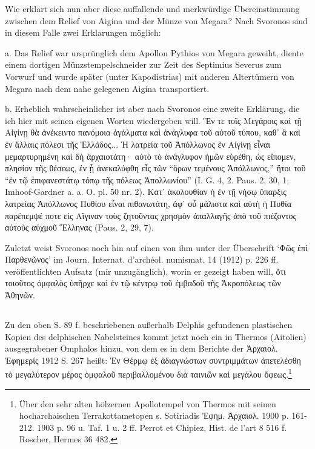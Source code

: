 \documentclass[a4paper, 11pt, oneside]{article}
\begin{document}
Wie erklärt sich nun aber diese auffallende und merkwürdige Übereinstimmung zwischen dem Relief von Aigina und der Münze von Megara? Nach Svoronos sind in diesem Falle zwei Erklarungen möglich:

a. Das Relief war ursprünglich dem Apollon Pythios von Megara geweiht, diente einem dortigen Münzstempelschneider zur Zeit des Septimius Severus zum Vorwurf und wurde später (unter Kapodistrias) mit anderen Altertümern von Megara nach dem nahe gelegenen Aigina transportiert.

b. Erheblich wahrscheinlicher ist aber nach Svoronos eine zweite Erklärung, die ich hier mit seinen eigenen Worten wiedergeben will. Ἔν τε τοῖς Μεγάροις καὶ τῇ Αἰγίνῃ θὰ ἀνέκειντο πανόμοια ἀγάλματα καὶ ἀνάγλυφα τοῦ αὐτοῦ τύπου, καθ᾽ ἃ καὶ ἐν ἄλλαις πόλεσι τῆς Ἑλλάδος... Ἡ λατρεία τοῦ Ἀπόλλωνος ἐν Αἰγίνῃ εἶναι μεμαρτυρημένη καὶ δὴ ἀρχαιοτάτη· αὐτὸ τὸ ἀνάγλυφον ἡμῶν εὑρέθη, ὡς εἴπομεν, πλησίον τῆς θέσεως, ἐν ᾗ ἀνεκαλύφθη εἷς τῶν "`ὅρων τεμένους Ἀπόλλωνος,"' ἤτοι τοῦ "`ἐν τῷ ἐπιφανεστάτῳ τόπῳ τῆς πόλεως Ἀπολλωνίου"' (I. G. 4, 2. Paus. 2, 30, 1; Imhoof-Gardner a. a. O. pl. 50 nr. 2). Κατ᾽ ἀκολουθίαν ἡ ἐν τῇ νήσῳ ὕπαρξις λατρείας Ἀπόλλωνος Πυθίου εἶναι πιθανωτάτη, ἀφ᾽ οὗ μάλιστα καὶ αὐτὴ ἡ Πυθία παρέπεμψέ ποτε εἰς Αἴγιναν τοὺς ζητοῦντας χρησμὸν ἀπαλλαγῆς ἀπὸ τοῦ πιέζοντος αὐτοὺς αὐχμοῦ Ἕλληνας (Paus. 2, 29, 7).

Zuletzt weist Svoronos noch hin auf einen von ihm unter der Überschrift `Φῶς ἐπὶ Παρθενῶνος' im Journ. Internat. d'archéol. numismat. 14 (1912) p. 226 ff. veröffentlichten Aufsatz (mir unzugänglich), worin er gezeigt haben will, ὅτι τοιοῦτος ὀμφαλὸς ὑπῆρχε καὶ ἐν τῷ κέντρῳ τοῦ ἐμβαδοῦ τῆς Ἀκροπόλεως τῶν Ἀθηνῶν.

\subsection{}
\paragraph{}
Zu den oben S. 89 f. beschriebenen außerhalb Delphis gefundenen plastischen Kopien des delphischen Nabelsteines kommt jetzt noch ein in Thermos (Aitolien) ausgegrabener Omphalos hinzu, von dem es in dem Berichte der Ἀρχαιολ. Ἐφημερίς 1912 S. 267 heißt: Ἐν Θέρμῳ ἐξ ἀδιαγνώστων συντριμμάτων ἀπετελέσθη τὸ μεγαλύτερον μέρος ὀμφαλοῦ περιβαλλομένου διὰ ταινιῶν καὶ μεγάλου ὄφεως.\footnote{Über den sehr alten hölzernen Apollotempel von Thermos mit seinen hocharchaischen Terrakottametopen s. Sotiriadis Ἐφημ. Ἀρχαιολ. 1900 p. 161-212. 1903 p. 96 u. Taf. 1 u. 2 ff. Perrot et Chipiez, Hist. de l'art 8 516 f. Roscher, Hermes 36 482.}
\end{document}
